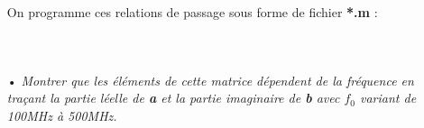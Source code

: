 \documentclass[10pt]{article}
\begin{document}
\begin{itemize}
        On programme ces relations de passage sous forme de fichier \textbf{*.m} :
        \inputminted[linenos]{matlab}{src/Z.m}
        \inputminted[linenos]{matlab}{src/z_normalise.m}
        \inputminted[linenos]{matlab}{src/S.m}


    \item[•] \textit{Montrer que les éléments de cette matrice dépendent de la fréquence en traçant la partie léelle de \textbf{a} et la partie imaginaire de \textbf{b} avec \textbf{$f_0$} variant de 100MHz à 500MHz.}

    \inputminted[linenos,lastline=20]{matlab}{src/BE.m}


\end{itemize}
\end{document}
